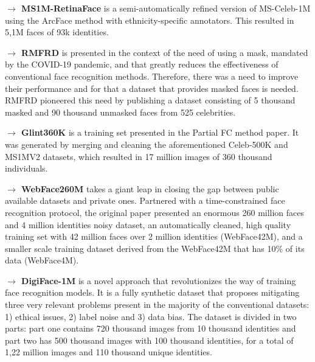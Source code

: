 \documentclass[class=report, crop=false, a4paper, 12pt]{standalone}
\begin{document}
\vspace{0.7\baselineskip}
\noindent\textbf{$\rightarrow$ MS1M-RetinaFace} \autocite{dengLightweightFaceRecognition2019} is a semi-automatically refined version of MS-Celeb-1M using the ArcFace method with ethnicity-specific annotators. This resulted in 5,1M faces of 93k identities.

\vspace{0.7\baselineskip}
\noindent\textbf{$\rightarrow$ RMFRD} \autocite{wangMaskedFaceRecognition2020} is presented in the context of the need of using a mask, mandated by the COVID-19 pandemic, and that greatly reduces the effectiveness of conventional face recognition methods. Therefore, there was a need to improve their performance and for that a dataset that provides masked faces is needed. RMFRD pioneered this need by publishing a dataset consisting of 5 thousand masked and 90 thousand unmasked faces from 525 celebrities.

\vspace{0.7\baselineskip}
\noindent\textbf{$\rightarrow$ Glint360K} \autocite{anPartialFCTraining2021} is a training set presented in the Partial FC method paper. It was generated by merging and cleaning the aforementioned Celeb-500K and MS1MV2 datasets, which resulted in 17 million images of 360 thousand individuals.

\vspace{0.7\baselineskip}
\noindent\textbf{$\rightarrow$ WebFace260M} \autocite{zhuWebFace260MBenchmarkUnveiling2021} takes a giant leap in closing the gap between public available datasets and private ones. Partnered with a time-constrained face recognition protocol, the original paper presented an enormous 260 million faces and 4 million identities noisy dataset, an automatically cleaned, high quality training set with 42 million faces over 2 million identities (WebFace42M), and a smaller scale training dataset derived from the WebFace42M that has 10\% of its data (WebFace4M).

\vspace{0.7\baselineskip}
\noindent\textbf{$\rightarrow$ DigiFace-1M} \autocite{baeDigiFace1MMillionDigital2023} is a novel approach that revolutionizes the way of training face recognition models. It is a fully synthetic dataset that proposes mitigating three very relevant problems present in the majority of the conventional datasets: 1) ethical issues, 2) label noise and 3) data bias. The dataset is divided in two parts: part one contains 720 thousand images from 10 thousand identities and part two has 500 thousand images with 100 thousand identities, for a total of 1,22 million images and 110 thousand unique identities.
\end{document}
